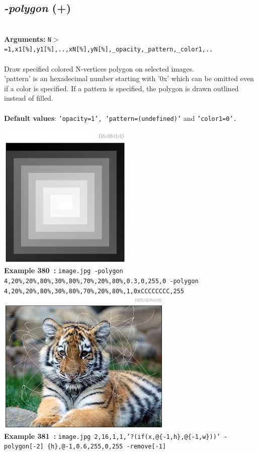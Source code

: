 \documentclass[a4paper,11pt,twoside]{book}
\begin{document}
\subsection{\emph{-polygon} (+)}\vspace*{-0.5em}
~\\\textbf{Arguments: } 
{\small \texttt{N$>$=1,x1[\%],y1[\%],..,xN[\%],yN[\%],\_opacity,\_pattern,\_color1,..}}\\~\\
Draw specified colored N-vertices polygon on selected images.
~\\'pattern' is an hexadecimal number starting with '0x' which can be omitted
even if a color is specified. If a pattern is specified, the polygon is
drawn outlined instead of filled.
~\\~\\\textbf{Default values}: {\small \texttt{'opacity=1', 'pattern=(undefined)'} and \texttt{'color1=0'.}}
\begin{center}\includegraphics[keepaspectratio=true,height=7cm,width=\textwidth]{img/gmic_def380.jpg}\\
{\footnotesize \textbf{Example 380~:} \texttt{image.jpg -polygon 4,20\%,20\%,80\%,30\%,80\%,70\%,20\%,80\%,0.3,0,255,0 -polygon 4,20\%,20\%,80\%,30\%,80\%,70\%,20\%,80\%,1,0xCCCCCCCC,255}}
\\\includegraphics[keepaspectratio=true,height=7cm,width=\textwidth]{img/gmic_def381.jpg}\\
{\footnotesize \textbf{Example 381~:} \texttt{image.jpg 2,16,1,1,'?(if(x,@\{-1,h\},@\{-1,w\}))' -polygon[-2] \{h\},@-1,0.6,255,0,255 -remove[-1]}}
\end{center}
\end{document}
